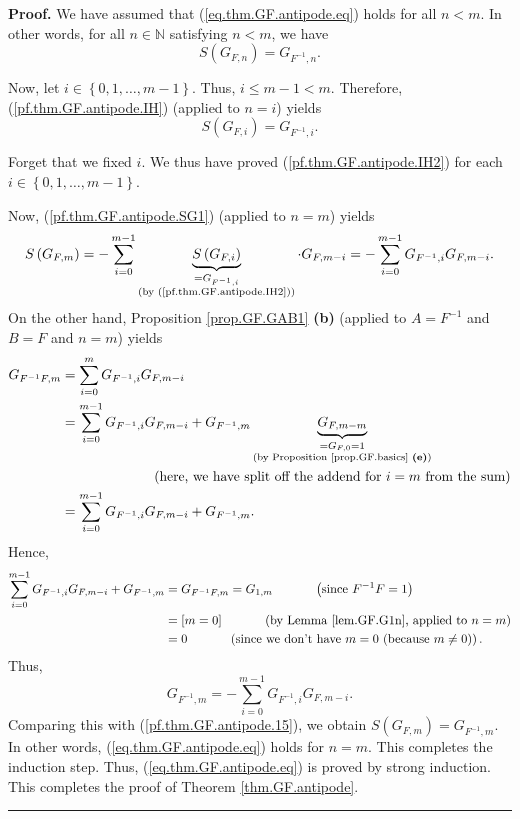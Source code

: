 \documentclass[numbers=enddot,12pt,final,onecolumn,notitlepage]{scrartcl}%
\theoremstyle{definition}
\newenvironment{proof}[1][Proof]{\noindent\textbf{#1.} }{\ \rule{0.5em}{0.5em}}
\let\sumnonlimits\sum
\renewcommand{\sum}{\sumnonlimits\limits}
\newenvironment{verlong}{}{}
\begin{document}
\begin{verlong}
\begin{proof}
We have assumed that (\ref{eq.thm.GF.antipode.eq}) holds for all $n<m$. In
other words, for all $n\in\mathbb{N}$ satisfying $n<m$, we have%
\begin{equation}
S\left(  G_{F,n}\right)  =G_{F^{-1},n}. \label{pf.thm.GF.antipode.IH}%
\end{equation}


Now, let $i\in\left\{  0,1,\ldots,m-1\right\}  $. Thus, $i\leq m-1<m$.
Therefore, (\ref{pf.thm.GF.antipode.IH}) (applied to $n=i$) yields
\begin{equation}
S\left(  G_{F,i}\right)  =G_{F^{-1},i}. \label{pf.thm.GF.antipode.IH2}%
\end{equation}


Forget that we fixed $i$. We thus have proved (\ref{pf.thm.GF.antipode.IH2})
for each $i\in\left\{  0,1,\ldots,m-1\right\}  $.

Now, (\ref{pf.thm.GF.antipode.SG1}) (applied to $n=m$) yields%
\begin{equation}
S\left(  G_{F,m}\right)  =-\sum_{i=0}^{m-1}\underbrace{S\left(  G_{F,i}%
\right)  }_{\substack{=G_{F^{-1},i}\\\text{(by (\ref{pf.thm.GF.antipode.IH2}%
))}}}\cdot G_{F,m-i}=-\sum_{i=0}^{m-1}G_{F^{-1},i}G_{F,m-i}.
\label{pf.thm.GF.antipode.15}%
\end{equation}
On the other hand, Proposition \ref{prop.GF.GAB1} \textbf{(b)} (applied to
$A=F^{-1}$ and $B=F$ and $n=m$) yields%
\begin{align*}
G_{F^{-1}F,m}  &  =\sum_{i=0}^{m}G_{F^{-1},i}G_{F,m-i}\\
&  =\sum_{i=0}^{m-1}G_{F^{-1},i}G_{F,m-i}+G_{F^{-1},m}\underbrace{G_{F,m-m}%
}_{\substack{=G_{F,0}=1\\\text{(by Proposition \ref{prop.GF.basics}
\textbf{(e)})}}}\\
&  \ \ \ \ \ \ \ \ \ \ \ \ \ \ \ \ \ \ \ \ \left(  \text{here, we have split
off the addend for }i=m\text{ from the sum}\right) \\
&  =\sum_{i=0}^{m-1}G_{F^{-1},i}G_{F,m-i}+G_{F^{-1},m}.
\end{align*}
Hence,%
\begin{align*}
\sum_{i=0}^{m-1}G_{F^{-1},i}G_{F,m-i}+G_{F^{-1},m}  &  =G_{F^{-1}F,m}%
=G_{1,m}\ \ \ \ \ \ \ \ \ \ \left(  \text{since }F^{-1}F=1\right) \\
&  =\left[  m=0\right]  \ \ \ \ \ \ \ \ \ \ \left(  \text{by Lemma
\ref{lem.GF.G1n}, applied to }n=m\right) \\
&  =0\ \ \ \ \ \ \ \ \ \ \left(  \text{since we don't have }m=0\text{ (because
}m\neq0\text{)}\right)  .
\end{align*}
Thus,%
\[
G_{F^{-1},m}=-\sum_{i=0}^{m-1}G_{F^{-1},i}G_{F,m-i}.
\]
Comparing this with (\ref{pf.thm.GF.antipode.15}), we obtain $S\left(
G_{F,m}\right)  =G_{F^{-1},m}$. In other words, (\ref{eq.thm.GF.antipode.eq})
holds for $n=m$. This completes the induction step. Thus,
(\ref{eq.thm.GF.antipode.eq}) is proved by strong induction. This completes
the proof of Theorem \ref{thm.GF.antipode}.
\end{proof}
\end{verlong}
\end{document}
